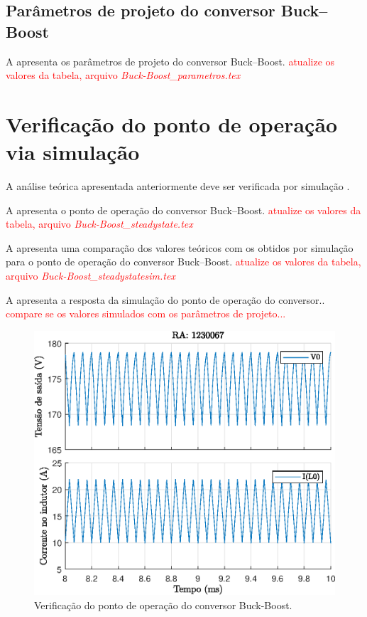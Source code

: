 \subsection{Parâmetros de projeto do conversor Buck--Boost}


A  apresenta os parâmetros de projeto do conversor Buck--Boost.
\textcolor{red}{atualize os valores da tabela, arquivo \emph{Buck-Boost\_parametros.tex} }



\section{Verificação do ponto de operação via simulação}

A análise teórica apresentada anteriormente deve ser verificada por simulação \cite{noauthor_psim_nodate}.

A  apresenta o ponto de operação do conversor Buck--Boost.
\textcolor{red}{atualize os valores da tabela, arquivo \emph{Buck-Boost\_steadystate.tex} }




A  apresenta uma comparação dos valores teóricos com os obtidos por simulação para o ponto de operação do conversor Buck--Boost.
\textcolor{red}{atualize os valores da tabela, arquivo \emph{Buck-Boost\_steadystatesim.tex} }



A  apresenta a resposta da simulação do ponto de operação do conversor..  \textcolor{red}{compare se os valores simulados com os parâmetros de projeto...}

\begin{figure}[!ht]
	\centering
	\includegraphics[width=0.9\linewidth]{Figs/Buck-Boost}
	\caption{Verificação do ponto de operação do conversor Buck-Boost.}
	\label{fig:buck-boost-steadystate}
\end{figure}



